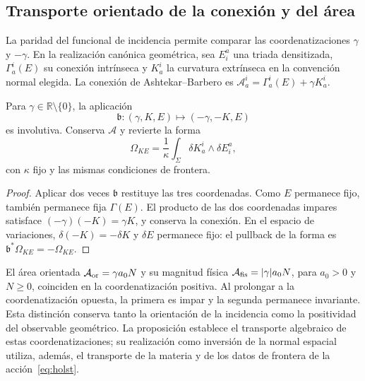 \subsection{Transporte orientado de la conexión y del área}
\label{sec:ii-costura-barbero}
La paridad del funcional de incidencia permite comparar las coordenatizaciones
\(\gamma\) y \(-\gamma\). En la realización canónica geométrica,
sea \(E^a_i\) una triada densitizada, \(\Gamma_a^i(E)\) su
conexión intrínseca y \(K_a^i\) la curvatura extrínseca en la
convención normal elegida. La conexión de Ashtekar--Barbero es
\(\mathcal A_a^i=\Gamma_a^i(E)+\gamma K_a^i\).

\begin{proposition}
\label{prop:ii-costura-barbero}
Para \(\gamma\in\mathbb R\setminus\{0\}\), la aplicación
\[
 \mathfrak b:(\gamma,K,E)\longmapsto(-\gamma,-K,E)
\]
es involutiva. Conserva \(\mathcal A\) y revierte la forma
\[
 \Omega_{KE}=\frac1\kappa\int_\Sigma
 \delta K_a^i\wedge\delta E^a_i,
\]
con \(\kappa\) fijo y las mismas condiciones de frontera.
\end{proposition}
\begin{proof}
Aplicar dos veces \(\mathfrak b\) restituye las tres coordenadas.
Como \(E\) permanece fijo, también permanece fija \(\Gamma(E)\).
El producto de las dos coordenadas impares satisface
\((-\gamma)(-K)=\gamma K\), y conserva la conexión.
En el espacio de variaciones, \(\delta(-K)=-\delta K\) y
\(\delta E\) permanece fijo: el pullback de la forma es
\(\mathfrak b^*\Omega_{KE}=-\Omega_{KE}\).
\end{proof}

El área orientada \(\mathcal A_{\rm or}=\gamma a_0N\) y su
magnitud física \(\mathcal A_{\rm fis}=|\gamma|a_0N\), para
\(a_0>0\) y \(N\geq0\), coinciden en la coordenatización positiva.
Al prolongar a la coordenatización opuesta, la primera es impar y la segunda
permanece invariante. Esta distinción conserva tanto la orientación
de la incidencia como la positividad del observable geométrico.
La proposición establece el transporte algebraico de estas coordenatizaciones;
su realización como inversión de la normal espacial utiliza,
además, el transporte de la materia y de los datos de frontera
de la acción~\eqref{eq:holst}.
